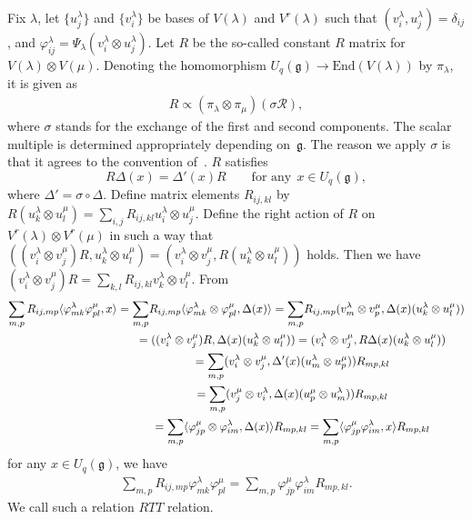 \documentclass[pdftex]{sigma}
\newcommand{\geh}{\mathfrak{g}}
\newcommand{\la}{\lambda}
\newcommand{\ot}{\otimes}
\newcommand{\pair}[1]{\langle{#1}\rangle}
\begin{document}
Fix $\la$, let $\{u^\la_j\}$ and $\{v^\la_i\}$ be bases of $V(\la)$ and $V^r(\la)$ such that
$(v^\la_i,u^\la_j)=\delta_{ij}$, and $\varphi^\la_{ij}=\Psi_\la(v^\la_i \otimes u^\la_j)$. Let $R$ be the
so-called constant $R$ matrix for $V(\la)\ot V(\mu)$. Denoting the homomorphism $U_q(\geh)\rightarrow
\mathrm{End}(V(\la))$ by $\pi_\la$, it is given as
\begin{gather}\label{eq:constR}
R\propto(\pi_\la\ot\pi_\mu)(\sigma\mathcal{R}),
\end{gather}
where $\sigma$ stands for the exchange of the f\/irst and second components.
The scalar multiple is determined appropriately depending on~$\geh$. The reason we apply $\sigma$
is that it agrees to the convention of~\cite{RTF}. $R$ satisf\/ies
\[
R\Delta(x)=\Delta'(x)R\qquad\text{for any} \ \ x\in U_q(\geh),
\]
where $\Delta'=\sigma\circ\Delta$.
Def\/ine matrix elements $R_{ij,kl}$ by $R(u^\la_k\ot u^\mu_l)=\sum_{i,j}R_{ij,kl}u^\la_i\ot u^\mu_j$.
Def\/ine the right action of $R$ on $V^r(\la)\ot V^r(\mu)$ in such a way that
$((v^\la_i\ot v^\mu_j)R,u^\la_k\ot u^\mu_l)=(v^\la_i\ot v^\mu_j,R(u^\la_k\ot u^\mu_l))$
holds. Then we have $(v^\la_i\ot v^\mu_j)R=\sum_{k,l}R_{ij,kl}v^\la_k\ot v^\mu_l$. From
\begin{gather*}
\sum_{m,p}R_{ij,mp}\pair{\varphi^\la_{mk}\varphi^\mu_{pl},x}
 = \sum_{m,p}\! R_{ij,mp}\pair{\varphi^\la_{mk}\ot\varphi^\mu_{pl},\Delta(x)}
 =\sum_{m,p} \! R_{ij,mp}(v^\la_m\ot v^\mu_p,\Delta(x)(u^\la_k\ot u^\mu_l))\\
 \hphantom{\sum_{m,p}R_{ij,mp}\pair{\varphi^\la_{mk}\varphi^\mu_{pl},x}}{}
 =((v^\la_i\ot v^\mu_j)R,\Delta(x)(u^\la_k\ot u^\mu_l))
 =(v^\la_i\ot v^\mu_j,R\Delta(x)(u^\la_k\ot u^\mu_l))\\
 \hphantom{\sum_{m,p}R_{ij,mp}\pair{\varphi^\la_{mk}\varphi^\mu_{pl},x}}{}
 =\sum_{m,p}(v^\la_i\ot v^\mu_j,\Delta'(x)(u^\la_m\ot u^\mu_p))R_{mp,kl}\\
\hphantom{\sum_{m,p}R_{ij,mp}\pair{\varphi^\la_{mk}\varphi^\mu_{pl},x}}{}
 =\sum_{m,p}(v^\mu_j\ot v^\la_i,\Delta(x)(u^\mu_p\ot u^\la_m))R_{mp,kl}\\
 \hphantom{\sum_{m,p}R_{ij,mp}\pair{\varphi^\la_{mk}\varphi^\mu_{pl},x}}{}
 =\sum_{m,p}\pair{\varphi^\mu_{jp}\ot\varphi^\la_{im},\Delta(x)}R_{mp,kl}
=\sum_{m,p}\pair{\varphi^\mu_{jp}\varphi^\la_{im},x}R_{mp,kl}
\end{gather*}
for any $x \in U_q(\geh)$, we have
\begin{gather}\label{eq:RTT}
\sum_{m,p}R_{ij,mp}\varphi^\la_{mk}\varphi^\mu_{pl}=\sum_{m,p}\varphi^\mu_{jp}\varphi^\la_{im}R_{mp,kl}.
\end{gather}
We call such a relation $RTT$ relation.
\end{document}
